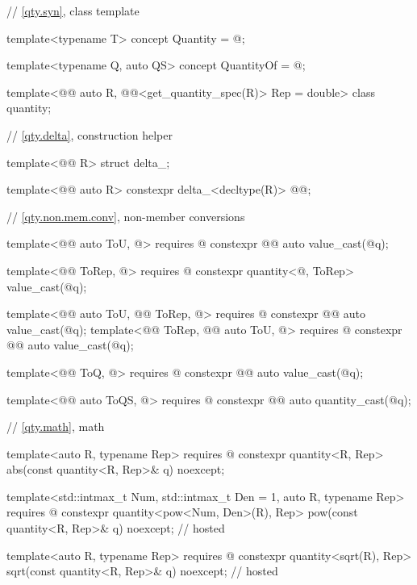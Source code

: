 \begin{codeblock}
{// \ref{qty.syn}, class template 

template<typename T>
concept Quantity = @\seebelownc@;

template<typename Q, auto QS>
concept QuantityOf = @\seebelownc@;

template<@@ auto R, @@<get_quantity_spec(R)> Rep = double>
class quantity;

// \ref{qty.delta}, construction helper 

template<@@ R>
struct delta_;

template<@@ auto R>
constexpr delta_<decltype(R)> @@{};

// \ref{qty.non.mem.conv}, non-member conversions

template<@@ auto ToU, @\seebelownc@>
  requires @\seebelownc@
constexpr @@ auto value_cast(@\seebelownc@ q);

template<@@ ToRep, @\seebelownc@>
  requires @\seebelownc@
constexpr quantity<@\seebelownc@, ToRep> value_cast(@\seebelownc@ q);

template<@@ auto ToU, @@ ToRep, @\seebelownc@>
  requires @\seebelownc@
constexpr @@ auto value_cast(@\seebelownc@ q);
template<@@ ToRep, @@ auto ToU, @\seebelownc@>
  requires @\seebelownc@
constexpr @@ auto value_cast(@\seebelownc@ q);

template<@@ ToQ, @\seebelownc@>
  requires @\seebelownc@
constexpr @@ auto value_cast(@\seebelownc@ q);

template<@@ auto ToQS, @\seebelownc@>
  requires @\seebelownc@
constexpr @@ auto quantity_cast(@\seebelownc@ q);

// \ref{qty.math}, math

template<auto R, typename Rep>
  requires @\seebelownc@
constexpr quantity<R, Rep> abs(const quantity<R, Rep>& q) noexcept;

template<std::intmax_t Num, std::intmax_t Den = 1, auto R, typename Rep>
  requires @\seebelownc@
constexpr quantity<pow<Num, Den>(R), Rep> pow(const quantity<R, Rep>& q) noexcept;      // hosted

template<auto R, typename Rep>
  requires @\seebelownc@
constexpr quantity<sqrt(R), Rep> sqrt(const quantity<R, Rep>& q) noexcept;              // hosted

}
\end{codeblock}
